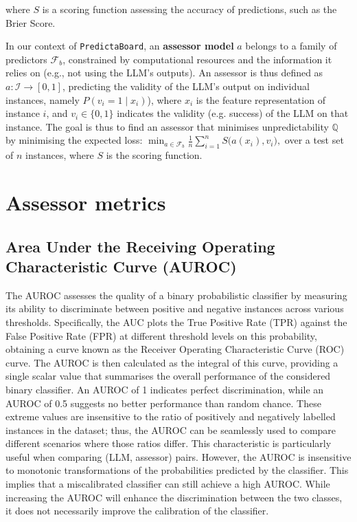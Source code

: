 \documentclass[11pt]{article}
\newcommand{\predbench}{{\tt PredictaBoard}\xspace}
\begin{document}
\noindent where $S$ is a scoring function assessing the accuracy of predictions, such as the Brier Score.


In our context of \predbench, an \textbf{assessor model} $a$ belongs to a family of predictors $\mathcal{F}_b$, constrained by computational resources and the information it relies on (e.g., not using the LLM's outputs). An assessor is thus defined as $a: \mathcal{I} \rightarrow [0,1]$, predicting the validity of the LLM's output on individual instances, namely $P(v_i = 1 \mid x_i)$), where $x_i$ is the feature representation of instance $i$, and $v_i \in \{0,1\}$ indicates the validity (e.g. success) of the LLM on that instance. The goal is thus to find an assessor that minimises unpredictability $\mathbb{Q}$ by minimising the expected loss:
$
\min_{a \in \mathcal{F}_b} \frac{1}{n} \sum_{i=1}^n S\big(a(x_i), v_i\big),
$
over a test set of $n$ instances, where $S$ is the scoring function.


\section{Assessor metrics}
\label{app:metrics}


\subsection{Area Under the Receiving Operating Characteristic Curve (AUROC)}
\label{app:metrics_auroc}
The AUROC assesses the quality of a binary probabilistic classifier by measuring its ability to discriminate between positive and negative instances across various thresholds. Specifically, the AUC plots the True Positive Rate (TPR) against the False Positive Rate (FPR) at different threshold levels on this probability, obtaining a curve known as the Receiver Operating Characteristic Curve (ROC) curve. The AUROC is then calculated as the integral of this curve, providing a single scalar value that summarises the overall performance of the considered binary classifier. 
An AUROC of 1 indicates perfect discrimination, while an AUROC of 0.5 suggests no better performance than random chance. These extreme values are insensitive to the ratio of positively and negatively labelled instances in the dataset; thus, the AUROC can be seamlessly used to compare different scenarios where those ratios differ. This characteristic is particularly useful when comparing (LLM, assessor) pairs.
However, the AUROC is insensitive to monotonic transformations of the probabilities predicted by the classifier. This implies that a miscalibrated classifier can still achieve a high AUROC. While increasing the AUROC will enhance the discrimination between the two classes, it does not necessarily improve the calibration of the classifier.
\end{document}
